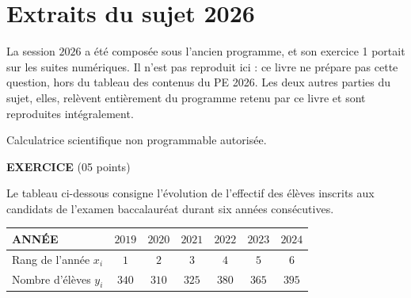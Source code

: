 \section{Extraits du sujet 2026}

\begin{notepourlaclasse}
La session $2026$ a été composée sous l'ancien programme, et son exercice 1
portait sur les suites numériques. Il n'est pas reproduit ici : ce livre ne
prépare pas cette question, hors du tableau des contenus du PE 2026. Les
deux autres parties du sujet, elles, relèvent entièrement du programme
retenu par ce livre et sont reproduites intégralement.
\end{notepourlaclasse}

\begin{devoirsurveille}
Calculatrice scientifique non programmable autorisée.

\vspace{0.7em}
\noindent\textbf{\sffamily EXERCICE} \hfill \textup{(05 points)}

Le tableau ci-dessous consigne l'évolution de l'effectif des élèves inscrits
aux candidats de l'examen baccalauréat durant six années consécutives.

\begin{center}\footnotesize
\renewcommand{\arraystretch}{1.25}
\begin{tabular}{|l|c|c|c|c|c|c|}
\hline
ANNÉE & $2019$ & $2020$ & $2021$ & $2022$ & $2023$ & $2024$\\
\hline
Rang de l'année $x_{i}$ & $1$ & $2$ & $3$ & $4$ & $5$ & $6$\\
\hline
Nombre d'élèves $y_{i}$ & $340$ & $310$ & $325$ & $380$ & $365$ & $395$\\
\hline
\end{tabular}
\end{center}


\end{devoirsurveille}
